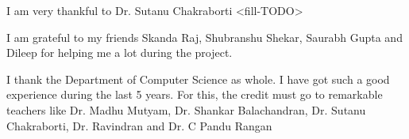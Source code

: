 \acknowledgements

I am very thankful to Dr. Sutanu Chakraborti <fill-TODO>

I am grateful to my friends Skanda Raj, Shubranshu Shekar, Saurabh Gupta and Dileep for helping me a lot during the project.

I thank the Department of Computer Science as
whole. 
I have got such a good experience during the last 5 years. For this, the credit must go to remarkable
teachers like  Dr. Madhu Mutyam, Dr. Shankar Balachandran, Dr.
Sutanu Chakraborti, Dr. Ravindran and Dr. C Pandu Rangan

